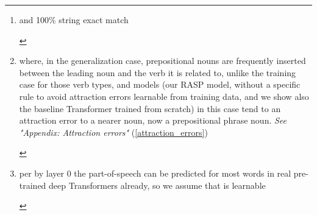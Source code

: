 \documentclass[11pt]{article}
\begin{document}
\begin{abstract}
\cite{Wu2023} variant of COGS systematically and compositionally: Our RASP model attains 100\% semantic exact match\footnote{\begin{footnotesize}and 100\% string exact match\end{footnotesize}} on the ReCOGS test set and 100\% SEM on all generalization splits except obj\_pp\_to\_subj\_pp\footnote{\begin{footnotesize}where, in the generalization case, prepositional nouns are frequently inserted between the leading noun and the verb it is related to, unlike the training case for those verb types, and models (our RASP model, without a specific rule to avoid attraction errors learnable from training data, and we show also the baseline Transformer trained from scratch) in this case tend to an attraction error to a nearer noun, now a prepositional phrase noun. \textit{See "Appendix: Attraction errors"} (\ref{attraction_errors})\end{footnotesize}} which gets 92\%. Furthermore, our RASP model shows the ReCOGS\_pos task does not require a hierarchical or tree-structured solution: we use word-level tokens with an "embedding" layer that tags with possible part of speech\footnote{\begin{footnotesize}per \cite{tenney2019bertrediscoversclassicalnlp} by layer 0 the part-of-speech can be predicted for most words in real pre-trained deep Transformers already, so we assume that is learnable\end{footnotesize}}, applying just once per encoder pass 19 attention-head compatible flat pattern-matching rules, shown using grammar coverage \cite{fuzzingbook2023:GrammarCoverageFuzzer} to be learnable from the training data, plus general prepositional phrase (pp) handling and complement phrase (cp) handling logic, and output the next logical form (LF) token (repeating until the LF is complete). The model does not apply recursive, tree-structured rules like `np\_det pp np -> np\_pp -> np`, but scores 100\% semantic and string exact match on pp recursion, cp recursion using the decoder loop.

\end{abstract}
\end{document}
